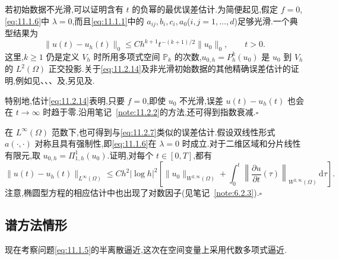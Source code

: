 \begin{note}
若初始数据不光滑,可以证明含有 \(t\) 的负幂的最优误差估计.为简便起见,假定 \(f=0\),\eqref{eq:11.1.6}中 \(\lambda=0\),而且\eqref{eq:11.1.1}中的 \(a_{ij},b_i,c_i,a_0\)(\(i,j=1,\ldots,d\))足够光滑.一个典型结果为
\begin{equation}\label{eq:11.2.14}
  \|u(t)-u_h(t)\|_0\le Ch^{k+1}t^{-(k+1)/2}\|u_0\|_0,\qquad t>0.
\end{equation}
这里,\(k\ge1\) 仍是定义 \(V_h\) 时所用多项式空间 \(\mathbb P_k\) 的次数,\(u_{0,h}=P_h^k(u_0)\) 是 \(u_0\) 到 \(V_h\) 的 \(L^2(\Omega)\) 正交投影.关于\eqref{eq:11.2.14}及非光滑初始数据的其他精确误差估计的证明,例如见、、、及,另见及.

特别地,估计\eqref{eq:11.2.14}表明,只要 \(f=0\),即使 \(u_0\) 不光滑,误差 \(u(t)-u_h(t)\) 也会在 \(t\to\infty\) 时趋于零.沿用笔记~\ref{note:11.2.2}的方法,还可得到指数衰减.\hfill\(\square\)
\end{note}

\begin{note}
在 \(L^\infty(\Omega)\) 范数下,也可得到与\eqref{eq:11.2.7}类似的误差估计.假设双线性形式 \(a(\cdot,\cdot)\) 对称且具有强制性,即\eqref{eq:11.1.6}在 \(\lambda=0\) 时成立.对于二维区域和分片线性有限元,取 \(u_{0,h}=\Pi_{1,h}^1(u_0)\).证明,对每个 \(t\in[0,T]\),都有
\[
  \|u(t)-u_h(t)\|_{L^\infty(\Omega)}
    \le Ch^2|\log h|^2\left[\|u_0\|_{W^{2,\infty}(\Omega)}
         +\int_0^t\left\|\frac{\partial u}{\partial t}(\tau)\right\|_{W^{2,\infty}(\Omega)}
                 \,\mathrm d\tau\right].
\]
注意,椭圆型方程的相应估计中也出现了对数因子(见笔记~\ref{note:6.2.3}).\hfill\(\square\)
\end{note}

\subsection{谱方法情形}\label{sec:11.2.2}

现在考察问题\eqref{eq:11.1.5}的半离散逼近,这次在空间变量上采用代数多项式逼近.


